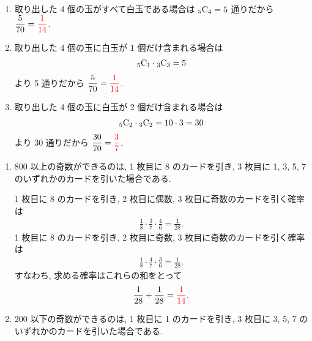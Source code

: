 \begin{qenumerate}
{\begin{enumerate}
			\item{
				取り出した 4 個の玉がすべて白玉である場合は ${{}_{5}\mathrm{C}_{4}} = 5$ 通りだから $\dfrac{5}{70} = \textcolor{red}{\dfrac{1}{14}}$.
			}
			\item{
				取り出した 4 個の玉に白玉が 1 個だけ含まれる場合は
				\begin{align}
					{{}_{5}\mathrm{C}_{1}}\cdot{{}_{3}\mathrm{C}_{3}} = 5
				\end{align}
				より 5 通りだから $\dfrac{5}{70} = \textcolor{red}{\dfrac{1}{14}}$.
			}
			\item{
				取り出した 4 個の玉に白玉が 2 個だけ含まれる場合は
				\begin{align}
					{{}_{5}\mathrm{C}_{2}}\cdot{{}_{3}\mathrm{C}_{2}} = 10\cdot3 = 30
				\end{align}
				より 30 通りだから $\dfrac{30}{70} = \textcolor{red}{\dfrac{3}{7}}$.
			}
		\end{enumerate}
	}
	\item{
		\begin{enumerate}
			\item{
				800 以上の奇数ができるのは, 1 枚目に 8 のカードを引き, 3 枚目に 1, 3, 5, 7 のいずれかのカードを引いた場合である.
		
				1 枚目に 8 のカードを引き, 2 枚目に偶数, 3 枚目に奇数のカードを引く確率は
				\begin{align}
					\frac{1}{8}\cdot\frac{3}{7}\cdot\frac{4}{6} = \frac{1}{28}.
				\end{align}
				1 枚目に 8 のカードを引き, 2 枚目に奇数, 3 枚目に奇数のカードを引く確率は
				\begin{align}
					\frac{1}{8}\cdot\frac{4}{7}\cdot\frac{3}{6} = \frac{1}{28}.
				\end{align}
				すなわち, 求める確率はこれらの和をとって
				\begin{align}
					\frac{1}{28} + \frac{1}{28} = \textcolor{red}{\frac{1}{14}}.
				\end{align}
			}
			\item{
				200 以下の奇数ができるのは, 1 枚目に 1 のカードを引き, 3 枚目に 3, 5, 7 のいずれかのカードを引いた場合である.
		
}
\end{enumerate}}
\end{qenumerate}

